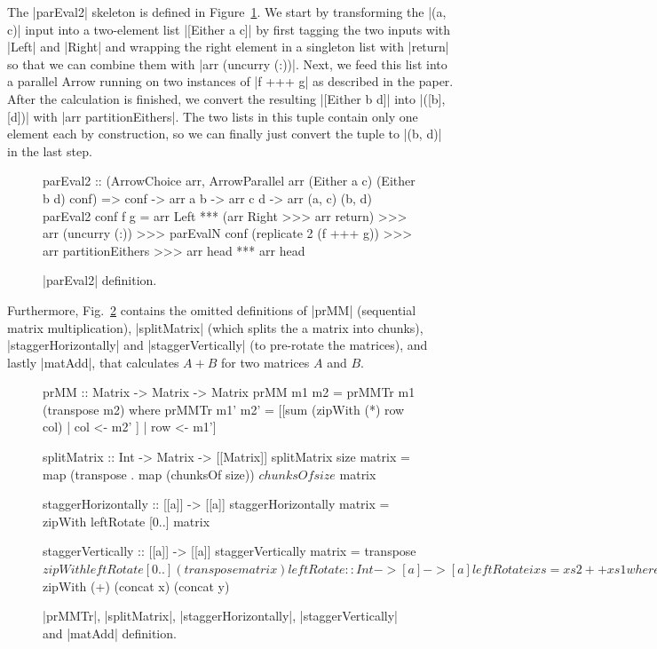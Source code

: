 The |parEval2| skeleton is defined in Figure~\ref{fig:parEval2}. 
We start by transforming the |(a, c)| input into a two-element list |[Either a c]| by first tagging the two inputs with |Left| and |Right| and wrapping the right element in a singleton list with |return| so that we can combine them with |arr (uncurry (:))|. Next, we feed this list into a parallel Arrow running on two instances of |f +++ g| as described in the paper. After the calculation is finished, we convert the resulting |[Either b d]| into |([b], [d])| with |arr partitionEithers|. The two lists in this tuple contain only one element each by construction, so we can finally just convert the tuple to |(b, d)| in the last step.
\begin{figure}[h]
\begin{code}
parEval2 :: (ArrowChoice arr,
	ArrowParallel arr (Either a c) (Either b d) conf) =>
	conf -> arr a b -> arr c d -> arr (a, c) (b, d)
parEval2 conf f g =
	arr Left *** (arr Right >>> arr return) >>>
	arr (uncurry (:)) >>>
	parEvalN conf (replicate 2 (f +++ g)) >>>
	arr partitionEithers >>>
	arr head *** arr head
\end{code}
	\caption{|parEval2| definition.}
	\label{fig:parEval2}
\end{figure}
Furthermore, Fig.~\ref{fig:torus_example_rest} contains the omitted definitions of |prMM| (sequential matrix multiplication), |splitMatrix| (which splits the a matrix into chunks), |staggerHorizontally| and |staggerVertically| (to pre-rotate the matrices), and lastly |matAdd|, that calculates $A + B$ for two matrices $A$ and $B$.
\begin{figure}[h]
\begin{code}
prMM :: Matrix -> Matrix -> Matrix
prMM m1 m2 = prMMTr m1 (transpose m2)
  where
    prMMTr m1' m2' = [[sum (zipWith (*) row col) | col <- m2' ] | row <- m1']

splitMatrix :: Int -> Matrix -> [[Matrix]]
splitMatrix size matrix = map (transpose . map (chunksOf size)) $ chunksOf size $ matrix

staggerHorizontally :: [[a]] -> [[a]]
staggerHorizontally matrix = zipWith leftRotate [0..] matrix

staggerVertically :: [[a]] -> [[a]]
staggerVertically matrix = transpose $ zipWith leftRotate [0..] (transpose matrix)

leftRotate :: Int -> [a] -> [a]
leftRotate i xs = xs2 ++ xs1 where
    (xs1,xs2) = splitAt i xs

matAdd = chunksOf (dimX x) $ zipWith (+) (concat x) (concat y)
\end{code}
	\caption{|prMMTr|, |splitMatrix|, |staggerHorizontally|, |staggerVertically| and |matAdd| definition.}
	\label{fig:torus_example_rest}
\end{figure} %

